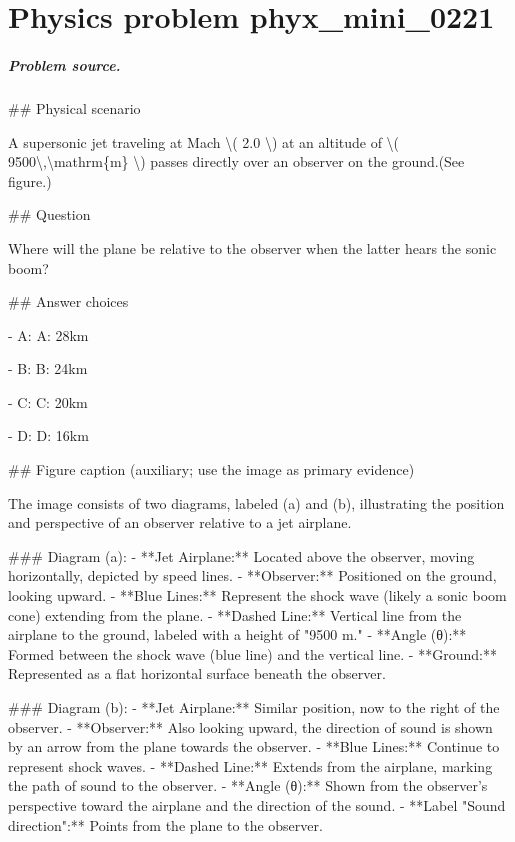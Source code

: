 
\chapter{Physics problem phyx\_mini\_0221}
\label{ch:PhyXMiniProblems_problem_phyx_mini_0221}

\paragraph{Problem source.}
\#\# Physical scenario

A supersonic jet traveling at Mach \textbackslash{}( 2.0 \textbackslash{}) at an altitude of \textbackslash{}( 9500\textbackslash{},\textbackslash{}mathrm\{m\} \textbackslash{}) passes directly over an observer on the ground.(See figure.)

\#\# Question

Where will the plane be relative to the observer when the latter hears the sonic boom?

\#\# Answer choices

- A: A: 28km

- B: B: 24km

- C: C: 20km

- D: D: 16km

\#\# Figure caption (auxiliary; use the image as primary evidence)

The image consists of two diagrams, labeled (a) and (b), illustrating the position and perspective of an observer relative to a jet airplane.

\#\#\# Diagram (a):
- **Jet Airplane:** Located above the observer, moving horizontally, depicted by speed lines.
- **Observer:** Positioned on the ground, looking upward.
- **Blue Lines:** Represent the shock wave (likely a sonic boom cone) extending from the plane.
- **Dashed Line:** Vertical line from the airplane to the ground, labeled with a height of "9500 m."
- **Angle (θ):** Formed between the shock wave (blue line) and the vertical line.
- **Ground:** Represented as a flat horizontal surface beneath the observer.

\#\#\# Diagram (b):
- **Jet Airplane:** Similar position, now to the right of the observer.
- **Observer:** Also looking upward, the direction of sound is shown by an arrow from the plane towards the observer.
- **Blue Lines:** Continue to represent shock waves.
- **Dashed Line:** Extends from the airplane, marking the path of sound to the observer.
- **Angle (θ):** Shown from the observer's perspective toward the airplane and the direction of the sound.
- **Label "Sound direction":** Points from the plane to the observer.

